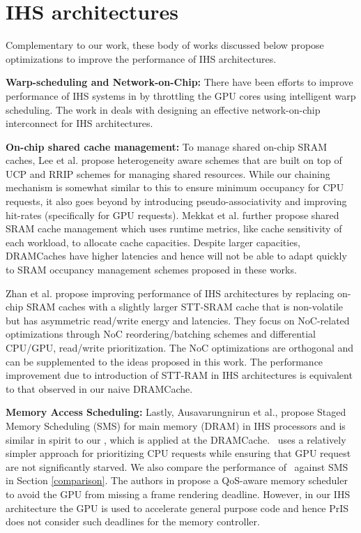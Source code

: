 \section{IHS architectures} \label{related-work-ihs-architecture}
Complementary to our work, these body of works discussed below propose optimizations to improve the performance of IHS architectures. 
\par \textbf{Warp-scheduling and Network-on-Chip:} There have been efforts to improve performance of IHS systems in \cite{gpu-concurrency} by throttling the GPU cores using intelligent warp scheduling. The work in \cite{interconnect} deals with designing an effective network-on-chip interconnect for IHS architectures. 
\par \textbf{On-chip shared cache management:} To manage shared on-chip SRAM caches, Lee et al. \cite{tap}  propose heterogeneity aware schemes that are built on top of UCP and RRIP schemes for managing shared resources. While our chaining mechanism is somewhat similar to this to ensure minimum occupancy for CPU requests, it also goes beyond by introducing pseudo-associativity and improving hit-rates (specifically for GPU requests). Mekkat et al. \cite{helm} further propose shared SRAM cache management which uses runtime metrics, like cache sensitivity of each workload, to allocate cache capacities. Despite larger capacities, DRAMCaches have higher latencies and hence will not be able to adapt quickly to SRAM occupancy management schemes proposed in these works. 
\par Zhan et al. \cite{oscar} propose improving performance of IHS architectures by replacing on-chip SRAM caches with a slightly larger STT-SRAM cache that is non-volatile but has asymmetric read/write energy and latencies. They focus on NoC-related optimizations through NoC reordering/batching schemes and differential CPU/GPU, read/write prioritization. The NoC optimizations are orthogonal and can be supplemented to the ideas proposed in this work. The performance improvement due to introduction of STT-RAM in IHS architectures is equivalent to that observed in our naive DRAMCache.
\par \textbf{Memory Access Scheduling:} Lastly, Ausavarungnirun et al., \cite{sms} propose Staged Memory Scheduling (SMS) for main memory (DRAM) in IHS processors and is similar in spirit to our \prioname, which is applied at the DRAMCache. \prioname\ uses a relatively simpler approach for prioritizing CPU requests while ensuring that GPU request are not significantly starved. We also compare the performance of \cachename\ against SMS in Section \ref{comparison}. The authors in \cite{qos-aware} propose a QoS-aware memory scheduler to avoid the GPU from missing a frame rendering deadline. However, in our IHS architecture the GPU is used to accelerate general purpose code and hence PrIS does not consider such deadlines for the memory controller.
